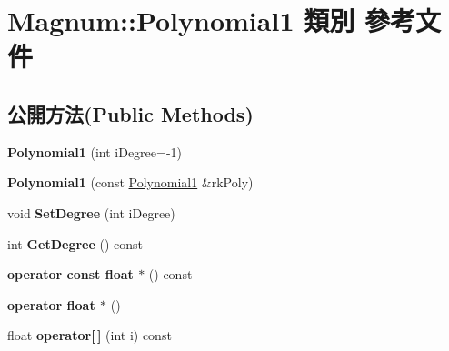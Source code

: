 \hypertarget{class_magnum_1_1_polynomial1}{}\section{Magnum\+:\+:Polynomial1 類別 參考文件}
\label{class_magnum_1_1_polynomial1}
\subsection*{公開方法(Public Methods)}
\begin{DoxyCompactItemize}
\item 
{\bfseries Polynomial1} (int i\+Degree=-\/1)\hypertarget{class_magnum_1_1_polynomial1_a95f3a7ad7d58f1889c44e4c0fcd2b489}{}\label{class_magnum_1_1_polynomial1_a95f3a7ad7d58f1889c44e4c0fcd2b489}

\item 
{\bfseries Polynomial1} (const \hyperlink{class_magnum_1_1_polynomial1}{Polynomial1} \&rk\+Poly)\hypertarget{class_magnum_1_1_polynomial1_ac32d90416220d9fd26b91f35fb75fa66}{}\label{class_magnum_1_1_polynomial1_ac32d90416220d9fd26b91f35fb75fa66}

\item 
void {\bfseries Set\+Degree} (int i\+Degree)\hypertarget{class_magnum_1_1_polynomial1_a3a7a2f569923ed30b53582362fdc87e2}{}\label{class_magnum_1_1_polynomial1_a3a7a2f569923ed30b53582362fdc87e2}

\item 
int {\bfseries Get\+Degree} () const \hypertarget{class_magnum_1_1_polynomial1_aeef2989f6c94c9b80c4757c00a4d0280}{}\label{class_magnum_1_1_polynomial1_aeef2989f6c94c9b80c4757c00a4d0280}

\item 
{\bfseries operator const float $\ast$} () const \hypertarget{class_magnum_1_1_polynomial1_a42f23e45ef36399777fcd9b099b94825}{}\label{class_magnum_1_1_polynomial1_a42f23e45ef36399777fcd9b099b94825}

\item 
{\bfseries operator float $\ast$} ()\hypertarget{class_magnum_1_1_polynomial1_a217bc1fa7f09c168ad1a58bfbb45c23e}{}\label{class_magnum_1_1_polynomial1_a217bc1fa7f09c168ad1a58bfbb45c23e}

\item 
float {\bfseries operator\mbox{[}$\,$\mbox{]}} (int i) const \hypertarget{class_magnum_1_1_polynomial1_adcce1a289c14d90f7772d172c4102785}{}\label{class_magnum_1_1_polynomial1_adcce1a289c14d90f7772d172c4102785}


\end{DoxyCompactItemize}
